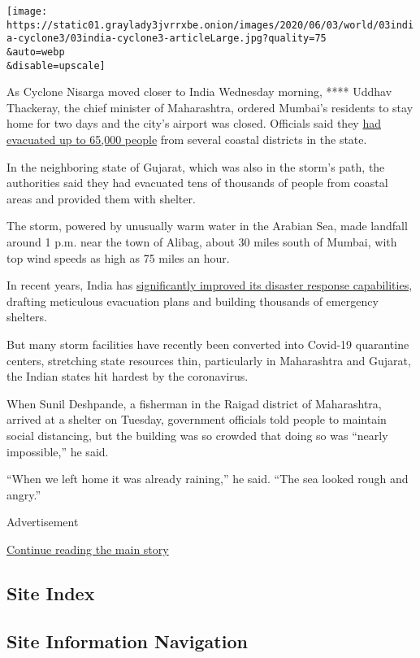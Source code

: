 \texttt{[image: https://static01.graylady3jvrrxbe.onion/images/2020/06/03/world/03india-cyclone3/03india-cyclone3-articleLarge.jpg?quality=75\\\&auto=webp\\\&disable=upscale]}

As Cyclone Nisarga moved closer to India Wednesday morning, **** Uddhav
Thackeray, the chief minister of Maharashtra, ordered Mumbai's residents
to stay home for two days and the city's airport was closed. Officials
said they
\href{https://www.hindustantimes.com/mumbai-news/cyclone-nisarga-65-000-people-living-close-to-coast-of-maharashtra-evacuated/story-tJ4iXT8Fi8MJ5gxmExTioO.html}{had
evacuated up to 65,000 people} from several coastal districts in the
state.

In the neighboring state of Gujarat, which was also in the storm's path,
the authorities said they had evacuated tens of thousands of people from
coastal areas and provided them with shelter.

The storm, powered by unusually warm water in the Arabian Sea, made
landfall around 1 p.m. near the town of Alibag, about 30 miles south of
Mumbai, with top wind speeds as high as 75 miles an hour.

In recent years, India has
\href{https://www.nytimes3xbfgragh.onion/2019/05/04/world/asia/india-cyclone.html}{significantly
improved its disaster response capabilities}, drafting meticulous
evacuation plans and building thousands of emergency shelters.

But many storm facilities have recently been converted into Covid-19
quarantine centers, stretching state resources thin, particularly in
Maharashtra and Gujarat, the Indian states hit hardest by the
coronavirus.

When Sunil Deshpande, a fisherman in the Raigad district of Maharashtra,
arrived at a shelter on Tuesday, government officials told people to
maintain social distancing, but the building was so crowded that doing
so was ``nearly impossible,'' he said.

``When we left home it was already raining,'' he said. ``The sea looked
rough and angry.''

Advertisement

\protect\hyperlink{after-bottom}{Continue reading the main story}

\hypertarget{site-index}{%
\subsection{Site Index}\label{site-index}}

\hypertarget{site-information-navigation}{%
\subsection{Site Information
Navigation}\label{site-information-navigation}}

